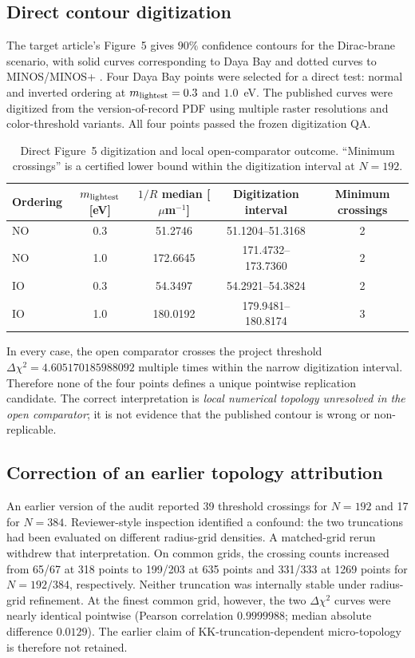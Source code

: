 \subsection{Direct contour digitization}\label{sec:digitization}

The target article's Figure~5 gives $90\%$ confidence contours for the Dirac-brane scenario, with solid curves corresponding to Daya Bay and dotted curves to MINOS/MINOS+ \autocite{degiorgi2026}. Four Daya Bay points were selected for a direct test: normal and inverted ordering at $m_{\rm lightest}=0.3$ and $1.0$~eV. The published curves were digitized from the version-of-record PDF using multiple raster resolutions and color-threshold variants. All four points passed the frozen digitization QA.

\begin{table}[H]
\centering
\caption{Direct Figure~5 digitization and local open-comparator outcome. ``Minimum crossings'' is a certified lower bound within the digitization interval at $N=192$.}
\label{tab:fig5}
\begin{tabular}{@{}lcccc@{}}
\toprule
Ordering & $m_{\rm lightest}$ [eV] & $1/R$ median [$\mu$m$^{-1}$] & Digitization interval & Minimum crossings \\
\midrule
NO & 0.3 & 51.2746  & 51.1204--51.3168   & 2 \\
NO & 1.0 & 172.6645 & 171.4732--173.7360 & 2 \\
IO & 0.3 & 54.3497  & 54.2921--54.3824   & 2 \\
IO & 1.0 & 180.0192 & 179.9481--180.8174 & 3 \\
\bottomrule
\end{tabular}
\end{table}

In every case, the open comparator crosses the project threshold $\Delta\chi^2=4.605170185988092$ multiple times within the narrow digitization interval. Therefore none of the four points defines a unique pointwise replication candidate. The correct interpretation is \emph{local numerical topology unresolved in the open comparator}; it is not evidence that the published contour is wrong or non-replicable.

\subsection{Correction of an earlier topology attribution}\label{sec:d28a}

An earlier version of the audit reported 39 threshold crossings for $N=192$ and 17 for $N=384$. Reviewer-style inspection identified a confound: the two truncations had been evaluated on different radius-grid densities. A matched-grid rerun withdrew that interpretation. On common grids, the crossing counts increased from 65/67 at 318 points to 199/203 at 635 points and 331/333 at 1269 points for $N=192/384$, respectively. Neither truncation was internally stable under radius-grid refinement. At the finest common grid, however, the two $\Delta\chi^2$ curves were nearly identical pointwise (Pearson correlation $0.9999988$; median absolute difference $0.0129$). The earlier claim of KK-truncation-dependent micro-topology is therefore not retained.

